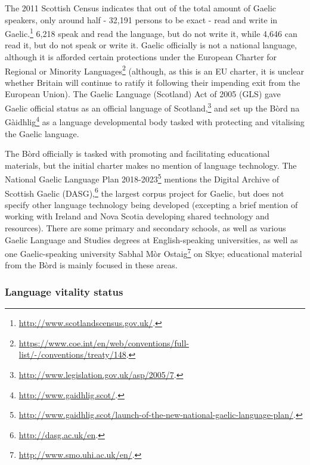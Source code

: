 The 2011 Scottish Census indicates that out of the total amount of Gaelic speakers, only around half - 32,191 persons to be exact - read and write in Gaelic.\footnote{\href{http://www.scotlandscensus.gov.uk/}{http://www.scotlandscensus.gov.uk/}. } 6,218 speak and read the language, but do not write it, while 4,646 can read it, but do not speak or write it. Gaelic officially is not a national language, although it is afforded certain protections under the European Charter for Regional or Minority Languages\footnote{\href{https://www.coe.int/en/web/conventions/full-list/-/conventions/treaty/148}{https://www.coe.int/en/web/conventions/full-list/-/conventions/treaty/148}. } (although, as this is an EU charter, it is unclear whether Britain will continue to ratify it following their impending exit from the European Union). The Gaelic Language (Scotland) Act of 2005 (GLS) gave Gaelic official status as an official language of Scotland,\footnote{\href{http://www.legislation.gov.uk/asp/2005/7}{http://www.legislation.gov.uk/asp/2005/7}. } and set up the B\`ord na G\`aidhlig\footnote{\href{http://www.gaidhlig.scot/}{http://www.gaidhlig.scot/}. } as a language developmental body tasked with protecting and vitalising the Gaelic language.

The B\`ord officially is tasked with promoting and facilitating educational materials, but the initial charter makes no mention of language technology. The National Gaelic Language Plan 2018-2023\footnote{\href{http://www.gaidhlig.scot/launch-of-the-new-national-gaelic-language-plan/}{http://www.gaidhlig.scot/launch-of-the-new-national-gaelic-language-plan/}. } \citep{bord2018national} mentions the Digital Archive of Scottish Gaelic (DASG),\footnote{\href{http://dasg.ac.uk/en}{http://dasg.ac.uk/en}. } the largest corpus project for Gaelic, but does not specify other language technology being developed (excepting a brief mention of working with Ireland and Nova Scotia developing shared technology and resources). There are some primary and secondary schools, as well as various Gaelic Language and Studies degrees at English-speaking universities, as well as one Gaelic-speaking university Sabhal M\`or Ostaig\footnote{\href{http://www.smo.uhi.ac.uk/en/}{http://www.smo.uhi.ac.uk/en/}. } on Skye; educational material from the B\`ord is mainly focused in these areas.

\subsubsection{Language vitality status}
\label{sec:gaelic-vitality-status}

